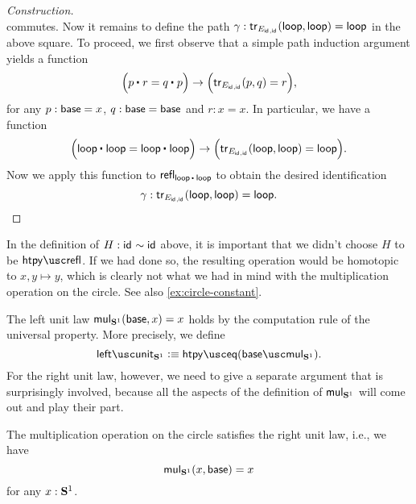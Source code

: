 \begin{proof}[Construction]
\begin{equation*}
  \end{equation*}
  commutes. Now it remains to define the path $\gamma:\mathsf{tr}_{E_{\mathsf{id}_{},\mathsf{id}_{}}}(\mathsf{loop},\mathsf{loop})=\mathsf{loop}$ in the above square. To proceed, we first observe that a simple path induction argument yields a function
  \begin{equation*}
    \Big(\ct{p}{r}=\ct{q}{p}\Big)\to\Big(\tr_{E_{\idfunc,\idfunc}}(p,q)=r\Big),
  \end{equation*}
  for any $p:\mathsf{base}=x$, $q:\mathsf{base}=\mathsf{base}$ and $r:x=x$. In particular, we have a function
  \begin{equation*}
    \Big(\ct{\lloop}{\lloop}=\ct{\lloop}{\lloop}\Big)\to\Big(\tr_{E_{\idfunc,\idfunc}}(\lloop,\lloop)=\lloop\Big).
  \end{equation*}
  Now we apply this function to $\refl{\ct{\lloop}{\lloop}}$ to obtain the desired identification
  \begin{equation*}
    \gamma:\mathsf{tr}_{E_{\mathsf{id}_{},\mathsf{id}_{}}}(\mathsf{loop},\mathsf{loop})=\mathsf{loop}.\qedhere
  \end{equation*}
\end{proof}

\begin{rmk}
  In the definition of $H:\mathsf{id}_{}\sim\mathsf{id}_{}$ above, it is important that we didn't choose $H$ to be $\htpyrefl$. If we had done so, the resulting operation would be homotopic to $x,y\mapsto y$, which is clearly not what we had in mind with the multiplication operation on the circle. See also \cref{ex:circle-constant}.
\end{rmk}


The left unit law $\mathsf{mul}_{\mathbf{S}^{1}}(\mathsf{base},x)=x$ holds by the computation rule of the universal property. More precisely, we define
\begin{equation*}
  \leftunit_{\sphere{1}}\defeq \htpyeq(\basemulcircle).
\end{equation*}
For the right unit law, however, we need to give a separate argument that is surprisingly involved, because all the aspects of the definition of $\mathsf{mul}_{\mathbf{S}^{1}}$ will come out and play their part.

\begin{thm}
  The multiplication operation on the circle satisfies the right unit law, i.e., we have
  \begin{equation*}
    \mathsf{mul}_{\mathbf{S}^{1}}(x,\mathsf{base})=x
  \end{equation*}
  for any $x:\mathbf{S}^{1}$.
\end{thm}

